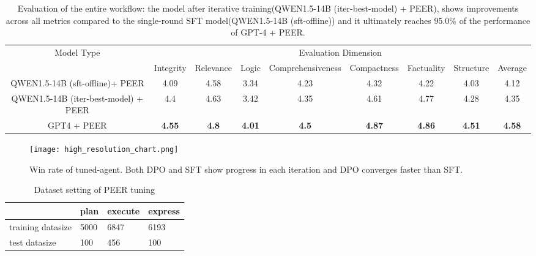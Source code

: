 \documentclass[11pt]{article}
\begin{document}
\begin{table*}[htbp]
\centering
\tiny
\renewcommand{\arraystretch}{1.5}
\begin{tabular}{c|c|c|c|c|c|c|c|c}
\hline
\multirow{2}{*}{\centering Model Type} & \multicolumn{8}{c}{Evaluation Dimension} \\
\cline{2-9}
 & Integrity & Relevance & Logic & Comprehensiveness & Compactness & Factuality & Structure & Average \\ 
\hline
QWEN1.5-14B (sft-offline)+ PEER      & 4.09      & 4.58      & 3.34  & 4.23              & 4.32        & 4.22       & 4.03      & 4.12    \\ 
\hline
QWEN1.5-14B (iter-best-model) + PEER & 4.4       & 4.63      & 3.42  & 4.35              & 4.61        & 4.77       & 4.28      & 4.35    \\ 
\hline
GPT4 + PEER & \textbf{4.55} & \textbf{4.8} & \textbf{4.01} & \textbf{4.5} & \textbf{4.87} & \textbf{4.86} & \textbf{4.51} & \textbf{4.58} \\ 
\hline
\end{tabular}
\captionsetup{font = footnotesize}
\caption{Evaluation of the entire workflow: the model after iterative training(QWEN1.5-14B (iter-best-model) + PEER), shows improvements across all metrics compared to the single-round SFT model(QWEN1.5-14B (sft-offline)) and it ultimately reaches 95.0\% of the performance of GPT-4 + PEER.}
\label{tab:peer-end2end}
\end{table*}


\begin{figure*}[htbp]
    \centering
    \texttt{[image: high\_resolution\_chart.png]}
    \caption{Win rate of tuned-agent. Both DPO and SFT show progress in each iteration and DPO converges faster than SFT.}
    \label{fig:tuning_win_rate}
\end{figure*}


\begin{table}[H]
    \caption{Dataset setting of PEER tuning}
    \footnotesize
    \centering
    \renewcommand{\arraystretch}{1.5}
    \begin{tabular}{l|l|l|l}
    \hline
                       & plan & execute & express \\ \hline
    training datasize  & 5000 & 6847    & 6193    \\ \hline
    test datasize      & 100  & 456     & 100     \\ \hline
    \end{tabular}
    \label{tab:dataset-table}
    \footnotesize
\end{table}
\end{document}
